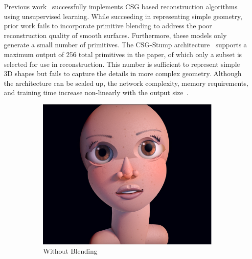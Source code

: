 Previous work~\cite{Sharma2018, Kania2020, Ren2021} successfully implements CSG based reconstruction algorithms using unsupervised learning. While succeeding in representing simple geometry, prior work fails to incorporate primitive blending to address the poor reconstruction quality of smooth surfaces. Furthermore, these models only generate a small number of primitives. The CSG-Stump architecture~\cite{Ren2021} supports a maximum output of 256 total primitives in the paper, of which only a subset is selected for use in reconstruction. This number is sufficient to represent simple 3D shapes but fails to capture the details in more complex geometry. Although the architecture can be scaled up, the network complexity, memory requirements, and training time increase non-linearly with the output size~\cite{Ren2021}.

\begin{figure}[!b]
	\centering
	\begin{subfigure}[t]{0.45\textwidth}
		\centering
		\includegraphics[width=\textwidth]{Images/Face without blending}
		\caption{Without Blending}
	\end{subfigure}
	\hfill
	\begin{subfigure}[t]{0.45\textwidth}
		\centering

\end{subfigure}
\end{figure}
